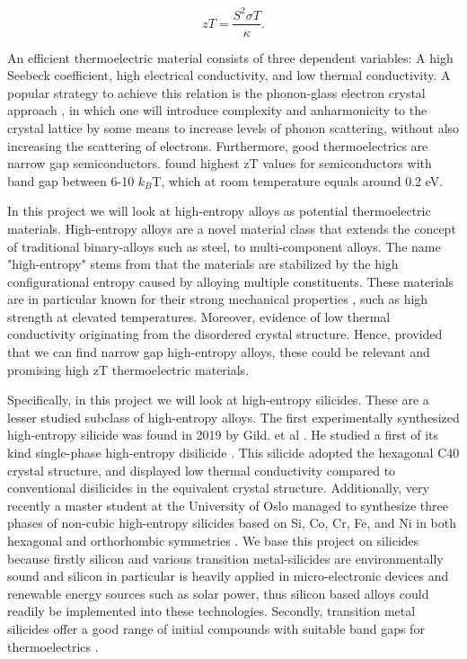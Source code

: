 \documentclass[UKenglish]{ifimaster}  %
\begin{document}
\begin{equation}
zT = \frac{S^2\sigma T}{\kappa}. 
\end{equation}

An efficient thermoelectric material consists of three dependent variables: A high Seebeck coefficient, high electrical conductivity, and low thermal conductivity. A popular strategy to achieve this relation is the phonon-glass electron crystal approach \cite{SnyderG.Jeffrey2008Ctm}, in which one will introduce complexity and anharmonicity to the crystal lattice by some means to increase levels of phonon scattering, without also increasing the scattering of electrons. Furthermore, good thermoelectrics are narrow gap semiconductors. \cite{TE_gap} found highest zT values for semiconductors with band gap between 6-10 $k_B$T, which at room temperature equals around 0.2 eV.   

In this project we will look at high-entropy alloys as potential thermoelectric materials. High-entropy alloys are a novel material class that extends the concept of traditional binary-alloys such as steel, to multi-component alloys. The name "high-entropy" stems from that the materials are stabilized by the high configurational entropy caused by alloying multiple constituents. These materials are in particular known for their strong mechanical properties \cite{hea}, such as high strength at elevated temperatures. Moreover, evidence of low thermal conductivity originating from the disordered crystal structure. Hence, provided that we can find narrow gap high-entropy alloys, these could be relevant and promising high zT thermoelectric materials.   

Specifically, in this project we will look at high-entropy silicides. These are a lesser studied subclass of high-entropy alloys. The first experimentally synthesized high-entropy silicide was found in 2019 by Gild. et al \cite{GILD2019337}. He studied a first of its kind single-phase high-entropy disilicide . This silicide adopted the hexagonal C40 crystal structure, and displayed low thermal conductivity compared to conventional disilicides in the equivalent crystal structure. Additionally, very recently a master student at the University of Oslo managed to synthesize three phases of non-cubic high-entropy silicides based on Si, Co, Cr, Fe, and Ni in both hexagonal and orthorhombic symmetries \cite{mari}. We base this project on silicides because firstly silicon and various transition metal-silicides are environmentally sound and silicon in particular is heavily applied in micro-electronic devices and renewable energy sources such as solar power, thus silicon based alloys could readily be implemented into these technologies. Secondly, transition metal silicides offer a good range of initial compounds with suitable band gaps for thermoelectrics \cite{silicde}.   
\end{document}
